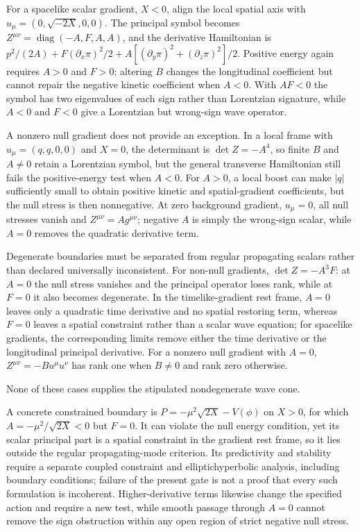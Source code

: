 \documentclass[11pt]{article}
\begin{document}
For a spacelike scalar gradient, $X<0$, align the local spatial axis with $u_\mu=(0,\sqrt{-2X},0,0)$. The principal symbol becomes $Z^{\mu\nu}=\operatorname{diag}(-A,F,A,A)$, and the derivative Hamiltonian is $p^2/(2A)+F(\partial_x\pi)^2/2+A[(\partial_y\pi)^2+(\partial_z\pi)^2]/2$. Positive energy again requires $A>0$ and $F>0$; altering $B$ changes the longitudinal coefficient but cannot repair the negative kinetic coefficient when $A<0$. With $AF<0$ the symbol has two eigenvalues of each sign rather than Lorentzian signature, while $A<0$ and $F<0$ give a Lorentzian but wrong-sign wave operator.

A nonzero null gradient does not provide an exception. In a local frame with $u_\mu=(q,q,0,0)$ and $X=0$, the determinant is $\det Z=-A^4$, so finite $B$ and $A\ne0$ retain a Lorentzian symbol, but the general transverse Hamiltonian still fails the positive-energy test when $A<0$. For $A>0$, a local boost can make $|q|$ sufficiently small to obtain positive kinetic and spatial-gradient coefficients, but the null stress is then nonnegative. At zero background gradient, $u_\mu=0$, all null stresses vanish and $Z^{\mu\nu}=A g^{\mu\nu}$; negative $A$ is simply the wrong-sign scalar, while $A=0$ removes the quadratic derivative term.

Degenerate boundaries must be separated from regular propagating scalars rather than declared universally inconsistent. For non-null gradients, $\det Z=-A^3F$: at $A=0$ the null stress vanishes and the principal operator loses rank, while at $F=0$ it also becomes degenerate. In the timelike-gradient rest frame, $A=0$ leaves only a quadratic time derivative and no spatial restoring term, whereas $F=0$ leaves a spatial constraint rather than a scalar wave equation; for spacelike gradients, the corresponding limits remove either the time derivative or the longitudinal principal derivative. For a nonzero null gradient with $A=0$, $Z^{\mu\nu}=-B u^\mu u^\nu$ has rank one when $B\ne0$ and rank zero otherwise.

None of these cases supplies the stipulated nondegenerate wave cone.

A concrete constrained boundary is $P=-\mu^2\sqrt{2X}-V(\phi)$ on $X>0$, for which $A=-\mu^2/\sqrt{2X}<0$ but $F=0$. It can violate the null energy condition, yet its scalar principal part is a spatial constraint in the gradient rest frame, so it lies outside the regular propagating-mode criterion. Its predictivity and stability require a separate coupled constraint and elliptic\textendash{}hyperbolic analysis, including boundary conditions; failure of the present gate is not a proof that every such formulation is incoherent. Higher-derivative terms likewise change the specified action and require a new test, while smooth passage through $A=0$ cannot remove the sign obstruction within any open region of strict negative null stress.
\end{document}
